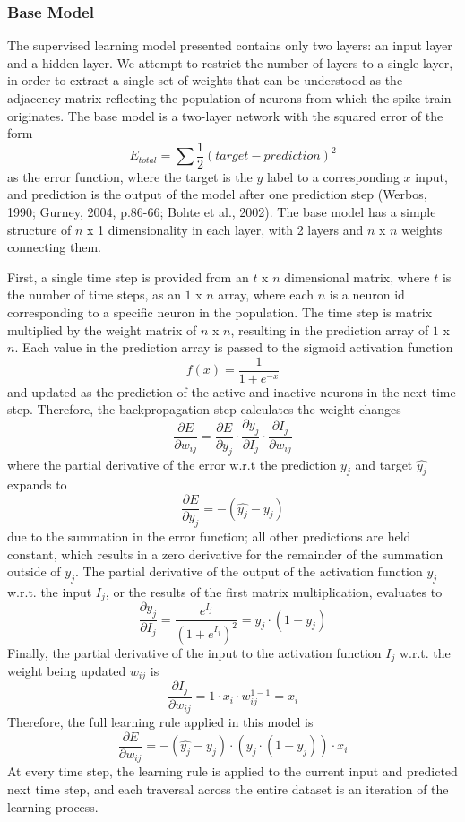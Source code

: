 \documentclass[11pt,titlepage]{article}
\begin{document}
\subsubsection{Base Model}\label{sssec:BM}
The supervised learning model presented contains only two layers: an input layer and a hidden layer. We attempt to restrict the number of layers to a single layer, in order to extract a single set of weights that can be understood as the adjacency matrix reflecting the population of neurons from which the spike-train originates. The base model is a two-layer network with the squared error of the form $$E_{total} = \sum{\frac{1}{2}(target-prediction)^2}$$ as the error function, where the target is the $y$ label to a corresponding $x$ input, and prediction is the output of the model after one prediction step (Werbos, 1990; Gurney, 2004, p.86-66; Bohte et al., 2002). The base model has a simple structure of $n$ x 1 dimensionality in each layer, with 2 layers and $n$ x $n$ weights connecting them.\par
First, a single time step is provided from an $t$ x $n$ dimensional matrix, where $t$ is the number of time steps, as an $1$ x $n$ array, where each $n$ is a neuron id corresponding to a specific neuron in the population. The time step is matrix multiplied by the weight matrix of $n$ x $n$, resulting in the prediction array of $1$ x $n$. Each value in the prediction array is passed to the sigmoid activation function $$ f(x) = \frac{1}{1 + e^{-x}}$$ and updated as the prediction of the active and inactive neurons in the next time step. Therefore, the backpropagation step calculates the weight changes $$\frac{\partial E}{\partial w_{ij}} = \frac{\partial E}{\partial y_j} \cdot \frac{\partial y_j}{\partial I_{j}} \cdot \frac{\partial I_{j}}{\partial w_{ij}}$$ where the partial derivative of the error w.r.t the prediction $y_j$ and target $\hat{y_j}$ expands to $$\frac{\partial E}{\partial y_j} = -(\hat{y_j} - y_j) $$ due to the summation in the error function; all other predictions are held constant, which results in a zero derivative for the remainder of the summation outside of $y_j$. The partial derivative of the output of the activation function $y_j$ w.r.t. the input $I_j$, or the results of the first matrix multiplication, evaluates to $$\frac{\partial y_j}{\partial I_j} = \frac{e^{I_j}}{(1+e^{I_j})^2} = y_j \cdot (1 - y_j)$$ Finally, the partial derivative of the input to the activation function $I_j$ w.r.t. the weight being updated $w_{ij}$ is $$\frac{\partial I_j}{\partial w_{ij}} = 1 \cdot x_i \cdot w_{ij}^{1-1} = x_i$$ Therefore, the full learning rule applied in this model is $$ \frac{\partial E}{\partial w_{ij}} = -(\hat{y_j}-y_j) \cdot (y_j \cdot (1-y_j))\cdot x_i$$ At every time step, the learning rule is applied to the current input and predicted next time step, and each traversal across the entire dataset is an iteration of the learning process.\par
\end{document}
